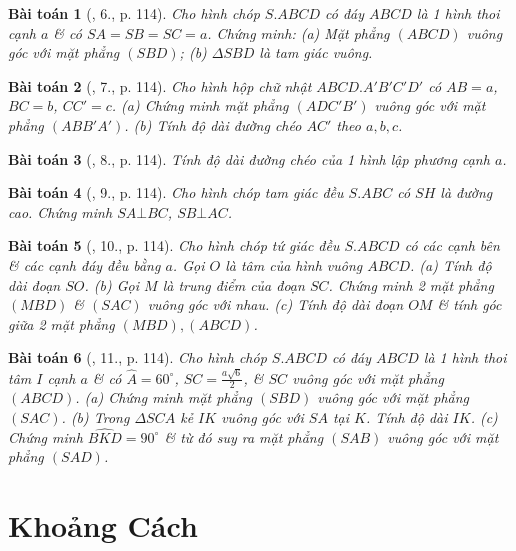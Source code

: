 \documentclass{article}
\numberwithin{equation}{section}
\newtheorem{baitoan}{Bài toán}
\begin{document}
\begin{baitoan}[\cite{SGK_Toan_11_hinh_hoc_co_ban}, 6., p. 114]
	Cho hình chóp $S.ABCD$ có đáy $ABCD$ là 1 hình thoi cạnh $a$ \& có $SA = SB = SC = a$. Chứng minh: (a) Mặt phẳng $(ABCD)$ vuông góc với mặt phẳng $(SBD)$; (b) $\Delta SBD$ là tam giác vuông.
\end{baitoan}

\begin{baitoan}[\cite{SGK_Toan_11_hinh_hoc_co_ban}, 7., p. 114]
	Cho hình hộp chữ nhật $ABCD.A'B'C'D'$ có $AB = a$, $BC = b$, $CC' = c$. (a) Chứng minh mặt phẳng $(ADC'B')$ vuông góc với mặt phẳng $(ABB'A')$. (b) Tính độ dài đường chéo $AC'$ theo $a,b,c$.
\end{baitoan}

\begin{baitoan}[\cite{SGK_Toan_11_hinh_hoc_co_ban}, 8., p. 114]
	Tính độ dài đường chéo của 1 hình lập phương cạnh $a$.
\end{baitoan}

\begin{baitoan}[\cite{SGK_Toan_11_hinh_hoc_co_ban}, 9., p. 114]
	Cho hình chóp tam giác đều $S.ABC$ có $SH$ là đường cao. Chứng minh $SA\bot BC$, $SB\bot AC$.
\end{baitoan}

\begin{baitoan}[\cite{SGK_Toan_11_hinh_hoc_co_ban}, 10., p. 114]
	Cho hình chóp tứ giác đều $S.ABCD$ có các cạnh bên \& các cạnh đáy đều bằng $a$. Gọi $O$ là tâm của hình vuông $ABCD$. (a) Tính độ dài đoạn $SO$. (b) Gọi $M$ là trung điểm của đoạn $SC$. Chứng minh 2 mặt phẳng $(MBD)$ \& $(SAC)$ vuông góc với nhau. (c) Tính độ dài đoạn $OM$ \& tính góc giữa 2 mặt phẳng $(MBD),(ABCD)$.
\end{baitoan}

\begin{baitoan}[\cite{SGK_Toan_11_hinh_hoc_co_ban}, 11., p. 114]
	Cho hình chóp $S.ABCD$ có đáy $ABCD$ là 1 hình thoi tâm $I$ cạnh $a$ \& có $\widehat{A} = 60^\circ$, $SC = \frac{a\sqrt{6}}{2}$, \& $SC$ vuông góc với mặt phẳng $(ABCD)$. (a) Chứng minh mặt phẳng $(SBD)$ vuông góc với mặt phẳng $(SAC)$. (b) Trong $\Delta SCA$ kẻ $IK$ vuông góc với $SA$ tại $K$. Tính độ dài $IK$. (c) Chứng minh $\widehat{BKD} = 90^\circ$ \& từ đó suy ra mặt phẳng $(SAB)$ vuông góc với mặt phẳng $(SAD)$.
\end{baitoan}


\section{Khoảng Cách}


\printbibliography[heading=bibintoc]
	
\end{document}
